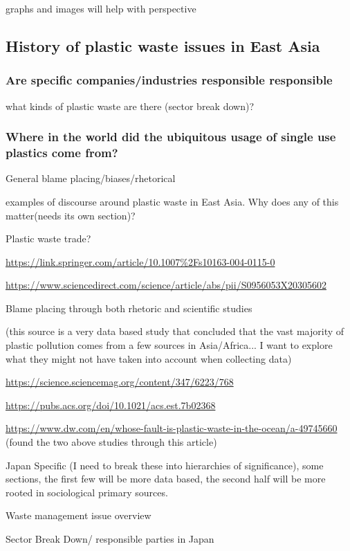 \documentclass{book}\usepackage{knitr}
\begin{document}
\begin{knitrout}
\begin{kframe}
graphs and images will help with perspective

\subsection{History of plastic waste issues in East Asia}

\subsubsection{Are specific companies/industries responsible responsible}

what kinds of plastic waste are there (sector break down)? 

\subsubsection{Where in the world did the ubiquitous usage of single use plastics come from?}

General blame placing/biases/rhetorical 

examples of discourse around plastic waste in East Asia. Why does any of this matter(needs its own section)?

Plastic waste trade? 

\url{https://link.springer.com/article/10.1007%2Fs10163-004-0115-0}

\url{https://www.sciencedirect.com/science/article/abs/pii/S0956053X20305602}

Blame placing through both rhetoric and scientific studies

(this source is a very data based study that concluded that the vast majority of plastic pollution comes from a few sources in Asia/Africa... I want to explore what they might not have taken into account when collecting data)

\url{https://science.sciencemag.org/content/347/6223/768}

\url{https://pubs.acs.org/doi/10.1021/acs.est.7b02368}

\url{https://www.dw.com/en/whose-fault-is-plastic-waste-in-the-ocean/a-49745660} (found the two above studies through this article)

Japan Specific (I need to break these into hierarchies of significance), some sections, the first  few will be more data based, the second half will be more rooted in sociological primary sources.

Waste management issue overview

Sector Break Down/ responsible parties in Japan


\end{kframe}
\end{knitrout}
\end{document}
